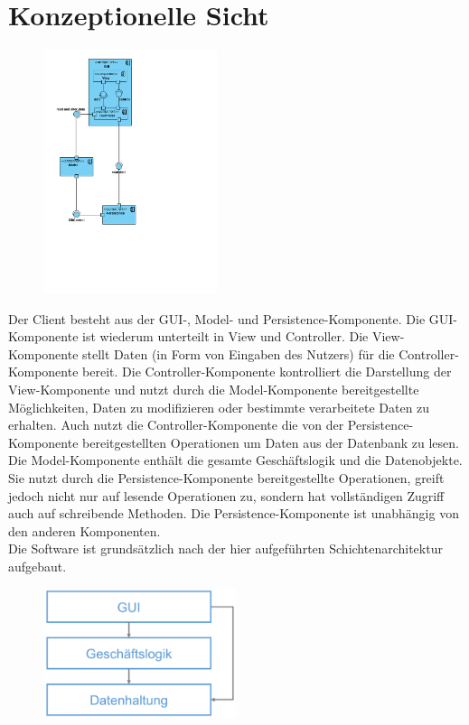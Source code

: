 \documentclass[fontsize=12pt,paper=a4,twoside]{scrartcl}
\begin{document}
\section{Konzeptionelle Sicht}
\label{sec:konzeptionell}

\begin{figure}[H]
\centering
\includegraphics[width=0.45\textwidth]{konzeptsicht.pdf}
\end{figure}


Der Client besteht aus der GUI-, Model- und Persistence-Komponente. Die GUI-Komponente ist wiederum unterteilt in View und Controller. Die View-Komponente stellt Daten (in Form von Eingaben des Nutzers) für die Controller-Komponente bereit. Die Controller-Komponente kontrolliert die Darstellung der View-Komponente und nutzt durch die Model-Komponente bereitgestellte Möglichkeiten, Daten zu modifizieren oder bestimmte verarbeitete Daten zu erhalten. Auch nutzt die Controller-Komponente die von der Persistence-Komponente bereitgestellten Operationen um Daten aus der Datenbank zu lesen. Die Model-Komponente enthält die gesamte Geschäftslogik und die Datenobjekte. Sie nutzt durch die Persistence-Komponente bereitgestellte Operationen, greift jedoch nicht nur auf lesende Operationen zu, sondern hat vollständigen Zugriff auch auf schreibende Methoden. Die Persistence-Komponente ist unabhängig von den anderen Komponenten.\\
Die Software ist grundsätzlich nach der hier aufgeführten Schichtenarchitektur aufgebaut.

\begin{figure}[H]
\centering
\includegraphics[width=0.5\textwidth]{schichten.pdf}
\end{figure}
\end{document}
